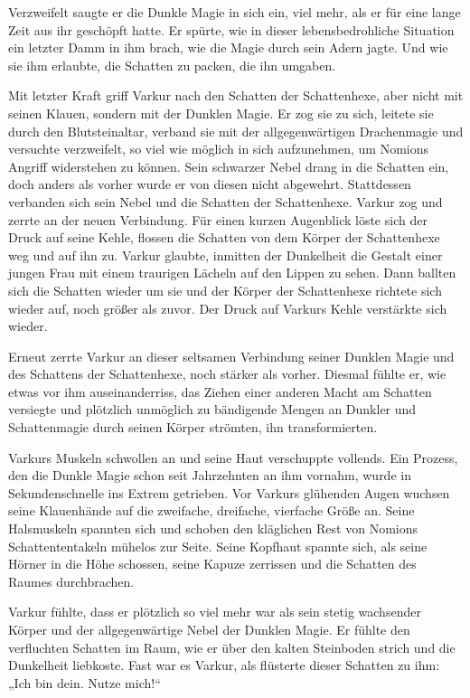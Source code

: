 \documentclass[10pt, a4paper, oneside]{book}
\begin{document}
Verzweifelt saugte er die Dunkle Magie in sich ein, viel mehr, als er für eine lange Zeit aus ihr geschöpft hatte. Er spürte, wie in dieser lebensbedrohliche Situation ein letzter Damm in ihm brach, wie die Magie durch sein Adern jagte. Und wie sie ihm erlaubte, die Schatten zu packen, die ihn umgaben.

Mit letzter Kraft griff Varkur nach den Schatten der Schattenhexe, aber nicht mit seinen Klauen, sondern mit der Dunklen Magie. Er zog sie zu sich, leitete sie durch den Blutsteinaltar, verband sie mit der allgegenwärtigen Drachenmagie und versuchte verzweifelt, so viel wie möglich in sich aufzunehmen, um Nomions Angriff widerstehen zu können. Sein schwarzer Nebel drang in die Schatten ein, doch anders als vorher wurde er von diesen nicht abgewehrt. Stattdessen verbanden sich sein Nebel und die Schatten der Schattenhexe. Varkur zog und zerrte an der neuen Verbindung. Für einen kurzen Augenblick löste sich der Druck auf seine Kehle, flossen die Schatten von dem Körper der Schattenhexe weg und auf ihn zu. Varkur glaubte, inmitten der Dunkelheit die Gestalt einer jungen Frau mit einem traurigen Lächeln auf den Lippen zu sehen. Dann ballten sich die Schatten wieder um sie und der Körper der Schattenhexe richtete sich wieder auf, noch größer als zuvor. Der Druck auf Varkurs Kehle verstärkte sich wieder.

Erneut zerrte Varkur an dieser seltsamen Verbindung seiner Dunklen Magie und des Schattens der Schattenhexe, noch stärker als vorher. Diesmal fühlte er, wie etwas vor ihm auseinanderriss, das Ziehen einer anderen Macht am Schatten versiegte und plötzlich unmöglich zu bändigende Mengen an Dunkler und Schattenmagie durch seinen Körper strömten, ihn transformierten.

Varkurs Muskeln schwollen an und seine Haut verschuppte vollends. Ein Prozess, den die Dunkle Magie schon seit Jahrzehnten an ihm vornahm, wurde in Sekundenschnelle ins Extrem getrieben. Vor Varkurs glühenden Augen wuchsen seine Klauenhände auf die zweifache, dreifache, vierfache Größe an. Seine Halsmuskeln spannten sich und schoben den kläglichen Rest von Nomions Schattententakeln mühelos zur Seite. Seine Kopfhaut spannte sich, als seine Hörner in die Höhe schossen, seine Kapuze zerrissen und die Schatten des Raumes durchbrachen.

Varkur fühlte, dass er plötzlich so viel mehr war als sein stetig wachsender Körper und der allgegenwärtige Nebel der Dunklen Magie. Er fühlte den verfluchten Schatten im Raum, wie er über den kalten Steinboden strich und die Dunkelheit liebkoste. Fast war es Varkur, als flüsterte dieser Schatten zu ihm: „Ich bin dein. Nutze mich!“
\end{document}
